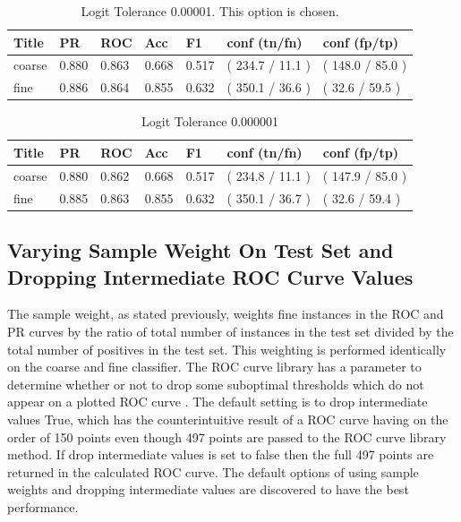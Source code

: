 \documentclass[ms]{nuthesis}
\begin{document}
\FloatBarrier
\begin{table}[h]
\centering
\caption{Logit Tolerance 0.00001. This option is chosen.}
\label{tab:LogReg-00001Redo}
\begin{tabular}{|l||l||l||l||l||l||l|}\toprule
Title & PR & ROC & Acc & F1 & conf (tn/fn) & conf (fp/tp) \\ \midrule
coarse & 0.880 & 0.863 & 0.668 & 0.517 & ( 234.7 / 11.1 ) & ( 148.0 / 85.0 ) \\
fine & 0.886 & 0.864 & 0.855 & 0.632 & ( 350.1 / 36.6 ) & ( 32.6 / 59.5 ) \\ \bottomrule
\end{tabular}
\end{table}
\FloatBarrier



\FloatBarrier
\begin{table}[H]
\centering
\caption{Logit Tolerance 0.000001}
\label{tab:LogReg-000001}
\begin{tabular}{|l||l||l||l||l||l||l|}\toprule
Title & PR & ROC & Acc & F1 & conf (tn/fn) & conf (fp/tp) \\ \midrule
coarse & 0.880 & 0.862 & 0.668 & 0.517 & ( 234.8 / 11.1 ) & ( 147.9 / 85.0 ) \\
fine & 0.885 & 0.863 & 0.855 & 0.632 & ( 350.1 / 36.7 ) & ( 32.6 / 59.4 ) \\ \bottomrule
\end{tabular}
\end{table}
\FloatBarrier

\subsection{Varying Sample Weight On Test Set and Dropping Intermediate ROC Curve Values}
\par The sample weight, as stated previously, weights fine instances in the ROC and PR curves by the ratio of
total number of instances in the test set divided by the total number of positives in the test set. This
weighting is performed identically on the coarse and fine classifier. The ROC curve library has a parameter to determine
whether or not to drop some suboptimal thresholds which do not appear on a plotted ROC curve \cite{scikit-learn}. The
default setting is to drop intermediate values True, which has the counterintuitive result of a ROC curve having on the order of
150 points even though 497 points are passed to the ROC curve library method. If drop intermediate values is set to false
then the full 497 points are returned in the calculated ROC curve. The default
options of using sample weights and dropping intermediate values are discovered to have the
best performance.
\end{document}
